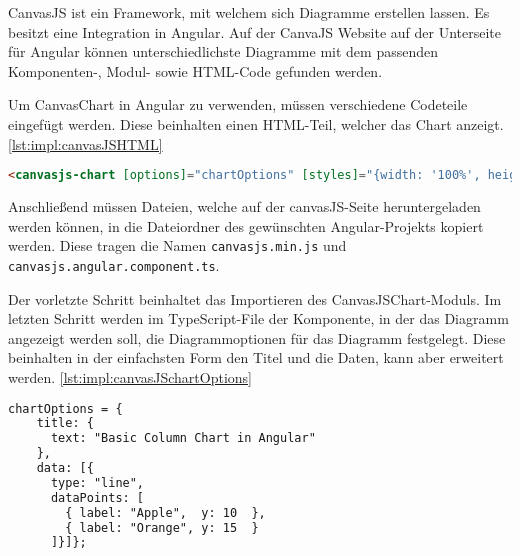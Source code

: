 CanvasJS ist ein Framework, mit welchem sich Diagramme erstellen lassen. Es besitzt eine Integration in Angular. Auf der CanvaJS Website auf der Unterseite für Angular können unterschiedlichste Diagramme mit dem passenden Komponenten-, Modul- sowie HTML-Code gefunden werden.
\cite{canvasJsOfficialSite}

Um CanvasChart in Angular zu verwenden, müssen verschiedene Codeteile eingefügt werden. Diese beinhalten einen HTML-Teil, welcher das Chart anzeigt. \ref{lst:impl:canvasJSHTML}
 
\begin{lstlisting}[language=html,caption=CanvasJS HTML,label=lst:impl:canvasJSHTML]
  <canvasjs-chart [options]="chartOptions" [styles]="{width: '100%', height: '360px'}"></canvasjs-chart>
\end{lstlisting}
 
Anschließend müssen Dateien, welche auf der canvasJS-Seite heruntergeladen werden können, in die Dateiordner des gewünschten Angular-Projekts kopiert werden. Diese tragen die Namen \texttt{canvasjs.min.js} und \texttt{canvasjs.angular.component.ts}.
 
Der vorletzte Schritt beinhaltet das Importieren des CanvasJSChart-Moduls.
Im letzten Schritt werden im TypeScript-File der Komponente, in der das Diagramm angezeigt werden soll, die Diagrammoptionen für das Diagramm festgelegt. Diese beinhalten in der einfachsten Form den Titel und die Daten, kann aber erweitert werden. \ref{lst:impl:canvasJSchartOptions}
 
\begin{lstlisting}[language=html,caption=CanvasJS chartOptiones,label=lst:impl:canvasJSchartOptions]
  chartOptions = {
    title: {
      text: "Basic Column Chart in Angular"
    },
    data: [{
      type: "line",
      dataPoints: [
        { label: "Apple",  y: 10  },
        { label: "Orange", y: 15  }
      ]}]};
\end{lstlisting}
 
\cite{canvasJsOfficialSite}